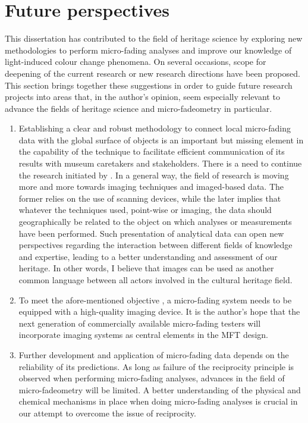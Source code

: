 \section{Future perspectives}


This dissertation has contributed to the field of heritage science by exploring new methodologies to perform micro-fading analyses and improve our knowledge of light-induced colour change phenomena. On several occasions, scope for deepening of the current research or new research directions have been proposed. This section brings together these suggestions in order to guide future research projects into areas that, in the author’s opinion, seem especially relevant to advance the fields of heritage science and micro-fadeometry in particular.\\

\begin{enumerate}
    \item Establishing a clear and robust methodology to connect local micro-fading data with the global surface of objects is an important but missing element in the capability of the technique to facilitate efficient communication of its results with museum caretakers and stakeholders. There is a need to continue the research initiated by \citet{morris_virtual_2007}. In a general way,  the field of research is moving more and more towards imaging techniques and imaged-based data. The former relies on the use of scanning devices, while the later implies that whatever the techniques used, point-wise or imaging, the data should geographically be related to the object on which analyses or measurements have been performed. Such presentation of analytical data can open new perspectives regarding the interaction between different fields of knowledge and expertise, leading to a better understanding and assessment of our heritage. In other words, I believe that images can be used as another common language between all actors involved in the cultural heritage field.      

    \item To meet the afore-mentioned objective , a micro-fading system needs to be equipped with a high-quality imaging device. It is the author’s hope that the next generation of commercially available micro-fading testers will incorporate imaging systems as central elements in the \gls{MFT} design. 

    \item Further development and application of micro-fading data depends on the reliability of its predictions. As long as failure of the reciprocity principle is observed when performing micro-fading analyses, advances in the field of micro-fadeometry will be limited. A better understanding of the physical and chemical mechanisms in place when doing micro-fading analyses is crucial in our attempt to overcome the issue of reciprocity. 


\end{enumerate}
